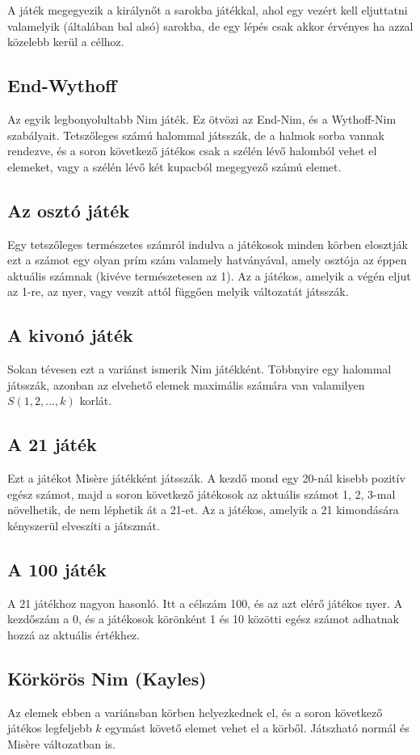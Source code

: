 A játék megegyezik a királynőt a sarokba játékkal, ahol egy vezért kell eljuttatni valamelyik (általában bal alsó) sarokba, de egy lépés csak akkor érvényes ha azzal közelebb kerül a célhoz.

\subsection{End-Wythoff}
Az egyik legbonyolultabb Nim játék. Ez ötvözi az End-Nim, és a Wythoff-Nim szabályait. Tetszőleges számú halommal játsszák, de a halmok sorba vannak rendezve, és a soron következő játékos csak a szélén lévő halomból vehet el elemeket, vagy a szélén lévő két kupacból megegyező számú elemet.

\subsection{Az osztó játék}
Egy tetszőleges természetes számról indulva a játékosok minden körben elosztják ezt a számot egy olyan prím szám valamely hatványával, amely osztója az éppen aktuális számnak (kivéve természetesen az 1). Az a játékos, amelyik a végén eljut az 1-re, az nyer, vagy veszít attól függően melyik változatát játsszák.

\subsection{A kivonó játék}
Sokan tévesen ezt a variánst ismerik Nim játékként. Többnyire egy halommal játsszák, azonban az elvehető elemek maximális számára van valamilyen $S(1, 2, ..., k)$ korlát.

\subsection{A 21 játék}
Ezt a játékot Misère játékként játsszák. A kezdő mond egy 20-nál kisebb pozitív egész számot, majd a soron következő játékosok az aktuális számot 1, 2, 3-mal növelhetik, de nem léphetik át a 21-et. Az a játékos, amelyik a 21 kimondására kényszerül elveszíti a játszmát.

\subsection{A 100 játék}
A 21 játékhoz nagyon hasonló. Itt a célszám 100, és az azt elérő játékos nyer. A kezdőszám a 0, és a játékosok körönként 1 és 10 közötti egész számot adhatnak hozzá az aktuális értékhez.

\subsection{Körkörös Nim (Kayles)}
Az elemek ebben a variánsban körben helyezkednek el, és a soron következő játékos legfeljebb $k$ egymást követő elemet vehet el a körből. Játszható normál és Misère változatban is.


